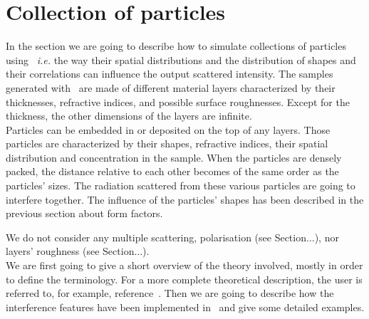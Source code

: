 \chapter{Collection of particles} \label{appendixinterf} 

In the section we are going to describe how to simulate collections of particles using \BornAgain\ \textit{i.e.} the way their spatial distributions and the distribution of shapes and their correlations can influence the output scattered intensity. The samples generated with \BornAgain\ are made of different material layers characterized by their thicknesses, refractive indices, and possible surface roughnesses. Except for the thickness, the other dimensions of the layers are infinite.\\ Particles can be embedded in or deposited on the top of any layers. Those particles are characterized by their shapes, refractive indices, their spatial distribution and concentration in the sample. When the particles are densely packed, the distance relative to each other becomes of the same order as the particles' sizes. The radiation scattered from these various particles are going to interfere together. The influence of the particles' shapes has been described in the previous section about form factors.

We do not consider any multiple scattering, polarisation (see Section...), nor layers' roughness (see Section...).\\ We are first going to give a short overview of the theory involved, mostly in order to define the terminology. For a more complete theoretical description, the user is referred to, for example, reference~\cite{ReLa09}. Then we are going to describe how the interference features have been implemented in \BornAgain\ and give some detailed examples.





